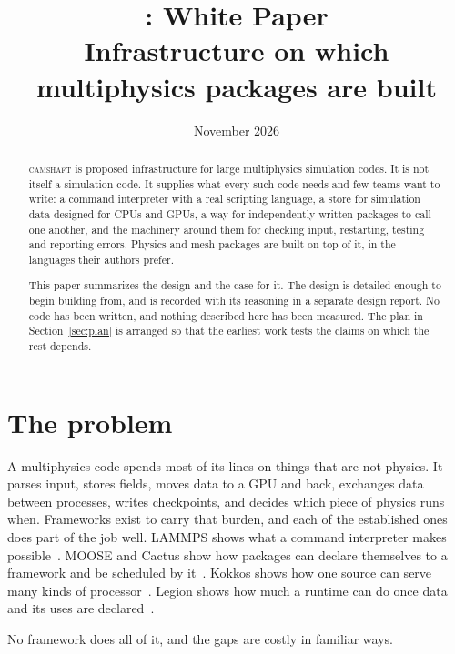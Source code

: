 \documentclass[11pt,a4paper]{article}
\title{\camshaft{}: White Paper\\[0.4ex]
\large Infrastructure on which multiphysics packages are built}
\author{}
\date{November 2026}
\newcommand{\camshaft}{\textsc{camshaft}}
\begin{document}
\maketitle

\begin{abstract}
\noindent
\camshaft{} is proposed infrastructure for large multiphysics simulation
codes.  It is not itself a simulation code.  It supplies what every such
code needs and few teams want to write: a command interpreter with a real
scripting language, a store for simulation data designed for CPUs and GPUs,
a way for independently written packages to call one another, and the
machinery around them for checking input, restarting, testing and reporting
errors.  Physics and mesh packages are built on top of it, in the languages
their authors prefer.

This paper summarizes the design and the case for it.  The design is
detailed enough to begin building from, and is recorded with its reasoning
in a separate design report.  No code has been written, and nothing described
here has been measured.  The plan in Section~\ref{sec:plan} is arranged so
that the earliest work tests the claims on which the rest depends.
\end{abstract}

\section{The problem}

A multiphysics code spends most of its lines on things that are not physics.
It parses input, stores fields, moves data to a GPU and back, exchanges data
between processes, writes checkpoints, and decides which piece of physics
runs when.  Frameworks exist to carry that burden, and each of the
established ones does part of the job well.  LAMMPS shows what a command
interpreter makes possible~\cite{lammps}.  MOOSE and Cactus show how
packages can declare themselves to a framework and be scheduled by
it~\cite{moose,cactus}.  Kokkos shows how one source can serve many kinds of
processor~\cite{kokkos3}.  Legion shows how much a runtime can do once data
and its uses are declared~\cite{legion}.

No framework does all of it, and the gaps are costly in familiar ways.
\end{document}

